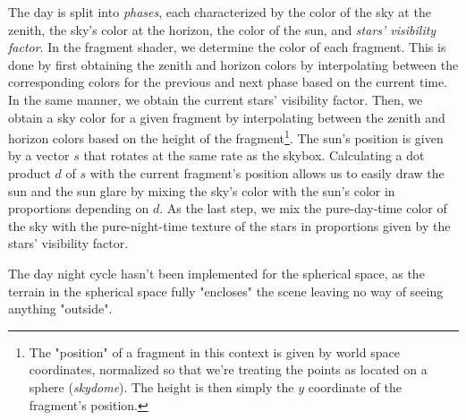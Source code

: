The day is split into \textit{phases}, each characterized by the color of the sky at the zenith, the sky's color at the horizon, the color of the sun, and \textit{stars' visibility factor}.
In the fragment shader, we determine the color of each fragment.
This is done by first obtaining the zenith and horizon colors by interpolating between the corresponding colors for the previous and next phase based on the current time.
In the same manner, we obtain the current stars' visibility factor.
Then, we obtain a sky color for a given fragment by interpolating between the zenith and horizon colors based on the height of the fragment\footnote{The "position" of a fragment in this context is given by world space coordinates, normalized so that we're treating the points as located on a sphere (\textit{skydome}). The height is then simply the $y$ coordinate of the fragment's position.}.
The sun's position is given by a vector $s$ that rotates at the same rate as the skybox.
Calculating a dot product $d$ of $s$ with the current fragment's position allows us to easily draw the sun and the sun glare by mixing the sky's color with the sun's color in proportions depending on $d$.
As the last step, we mix the pure-day-time color of the sky with the pure-night-time texture of the stars in proportions given by the stars' visibility factor.

The day night cycle hasn't been implemented for the spherical space, as the terrain in the spherical space fully "encloses" the scene leaving no way of seeing anything "outside".